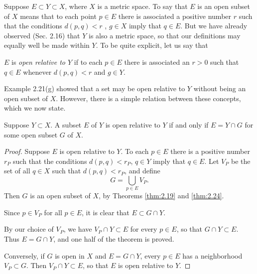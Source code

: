 \begin{myRemark}
    Suppose $E \subset Y \subset X$, where $X$ is a metric space. To say that $E$ is an open subset of $X$ means that to each point $p \in E$ there is associated a positive number $r$ such that the conditions $d(p,q) < r$ , $g \in X$ imply that $q \in E$. But we have already observed (Sec. 2.16) that $Y$ is also a metric space, so that our definitions may equally well be made within $Y$. To be quite explicit, let us say that 
    
    $E$ is \emph{open relative to $Y$} if to each $p \in E$ there is associated an $r > 0$ such that $q \in E$ whenever $d(p,q) <r$ and $g \in Y$. 
    
    Example 2.21(g) showed that a set may be open relative to $Y$ without being an open subset of $X$. However, there is a simple relation between these concepts, which we now state.
\end{myRemark}

\begin{thm}
    \label{thm:2.30}
    Suppose $Y \subset X$. A subset $E$ of $Y$ is open relative to $Y$ if and only if $E = Y \cap G$ for some open subset $G$ of $X$.
\end{thm}
\begin{proof}
    Suppose $E$ is open relative to $Y$. 
    To each $p \in E$ there is a positive number $r_P$ 
    such that the conditions $d(p, q) < r_P$, 
    $q \in Y$ imply that $q \in E$. 
    Let $V_P$ be the set of all $q \in X$ 
    such that $d(p, q) < r_P$, and define
    \begin{equation*}
        G = \bigcup_{p \in E} V_P.
    \end{equation*}
    Then $G$ is an open subset of $X$, by Theorems \ref{thm:2.19} and \ref{thm:2.24}. 

    Since $p \in V_P$ for all $p \in E$, 
    it is clear that $E \subset G \cap Y$.
    
    By our choice of $V_P$, 
    we have $V_P \cap Y \subset E$ for every $p \in E$, 
    so that $G \cap Y \subset E$. 
    Thus $E = G \cap Y$, and one half of the theorem is proved.
    
    Conversely, if $G$ is open in $X$ and $E = G \cap Y$, 
    every $p \in E$ has a neighborhood $V_P \subset G$. 
    Then $V_P \cap Y \subset E$, 
    so that $E$ is open relative to $Y$.
\end{proof}
